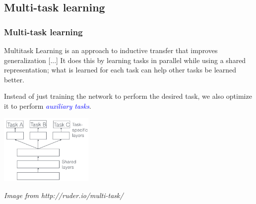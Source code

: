 \documentclass[10pt]{beamer}
\begin{document}
\subsection{Multi-task learning}

\begin{frame}
  \frametitle{Multi-task learning}

  \bigskip


  \begin{displayquote}
    Multitask Learning is an approach to inductive transfer that
    improves generalization [...] It
    does this by learning tasks in parallel while using a shared
    representation; what is learned for each task can help other tasks
    be learned better.
  \end{displayquote}

  \bigskip

  Instead of just training the network to perform the desired task, we
  also optimize it to perform \textcolor{blue}{\emph{auxiliary
      tasks}}.

  \begin{center}
    \includegraphics[width = 4.5cm]{images/multi_task_learning.png}
  \end{center}

  {\scriptsize \textit{Image from http://ruder.io/multi-task/}}
\end{frame}
\end{document}
